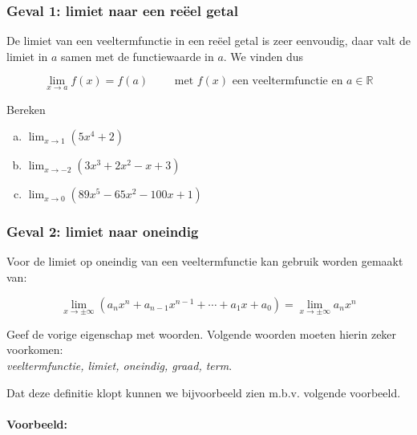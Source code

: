 \documentclass[12pt,twoside,a4paper]{article}
\newenvironment{eigenschap}
{
  \vspace{0.4cm}
  \begin{mdframed}[nobreak=true,frametitle={Eigenschap}]
  }{%
  \end{mdframed}
}
\begin{document}
\subsubsection*{Geval 1: limiet naar een reëel getal}

De limiet van een veeltermfunctie in een reëel getal is zeer eenvoudig, daar valt de limiet in $a$ samen met de functiewaarde in $a$. We vinden dus

\begin{eigenschap}
  $$\lim_{x\to a}f(x)=f(a) \qquad \mbox{ met $f(x)$ een veeltermfunctie en $a\in\mathbb{R}$}$$
\end{eigenschap}

\begin{oefening}
  Bereken
  \begin{enumerate}[(a)]
  \itemsep.5em
  \item $\displaystyle\lim_{x\to1}\left(5x^4+2\right)$
  \item $\displaystyle\lim_{x\to-2}\left(3x^3+2x^2-x+3\right)$
  \item $\displaystyle\lim_{x\to0}\left(89x^5-65x^2-100x+1\right)$
  \end{enumerate}
\end{oefening}

\subsubsection*{Geval 2: limiet naar oneindig}

Voor de limiet op oneindig van een veeltermfunctie kan gebruik worden gemaakt van:

\begin{eigenschap}
  $$\lim_{x\to\pm\infty}\left(a_nx^n+a_{n-1}x^{n-1}+\cdots+a_1x+a_0\right) = \lim_{x\to\pm\infty}a_nx^n$$
\end{eigenschap}

\begin{oefening}
  Geef de vorige eigenschap met woorden. Volgende woorden moeten hierin zeker voorkomen:\\
  {\em veeltermfunctie, limiet, oneindig, graad, term}.
\end{oefening}

Dat deze definitie klopt kunnen we bijvoorbeeld zien m.b.v. volgende voorbeeld.

\paragraph*{Voorbeeld:}
\end{document}
